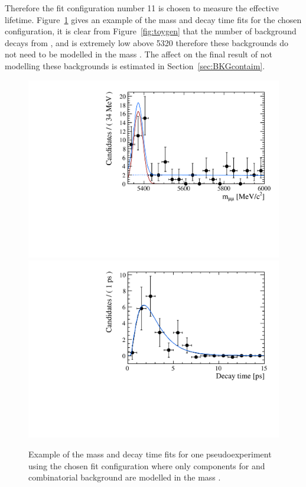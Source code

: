 


Therefore the fit configuration number 11 is chosen to measure the \bsmumu effective lifetime. Figure~\ref{fig:toyegs} gives an example of the mass and decay time \ml fits for the chosen configuration, it is clear from Figure~\ref{fig:toygen} that the number of background decays from \bdmumu, \bhh and \lambdab is extremely low above 5320 \mevcc therefore these backgrounds do not need to be modelled in the mass \pdf. The affect on the final result of not modelling these backgrounds is estimated in Section~\ref{sec:BKGcontaim}.

\begin{figure}[htbp]
    \centering
        \includegraphics[width= 0.49 \textwidth]{./Figs/LifetimeMeasurement/5320-6000_toy_mass.pdf}
       \includegraphics[width=0.49 \textwidth]{./Figs/LifetimeMeasurement/5320-6000_toy_lifetime.pdf}
    \caption{Example of the mass and decay time \ml fits for one pseudoexperiment using the chosen fit configuration where only components for \bsmumu and combinatorial background are modelled in the mass \pdf.}
    \label{fig:toyegs}
\end{figure}

